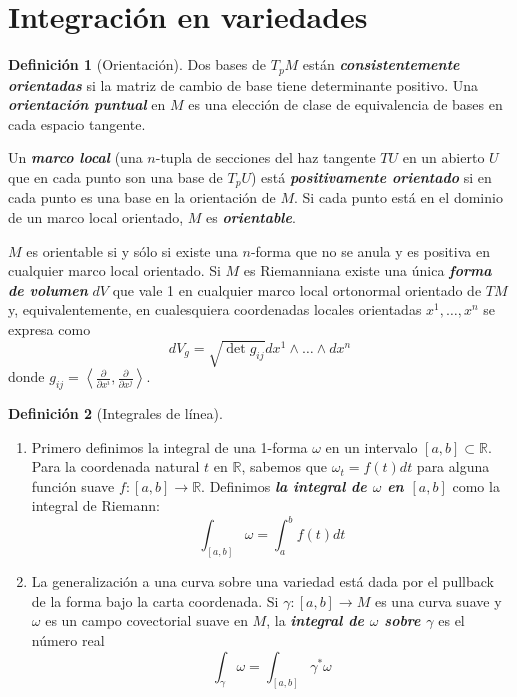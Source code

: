 \documentclass[spanish]{article}
\theoremstyle{definition}
\newtheorem*{defn}{Definición}
\newcommand{\R}{\mathbb{R}}
\begin{document}
	
	
	\section{Integración en variedades}\label{sec:3}
	\begin{defn}[Orientación]\leavevmode
		
		Dos bases de $T_pM$ están \textbf{\textit{consistentemente orientadas}} si la matriz de cambio de base tiene determinante positivo. Una \textbf{\textit{orientación puntual}} en $M$ es una elección de clase de equivalencia de bases en cada espacio tangente. 
		
		Un \textbf{\textit{marco local}} (una $n$-tupla de secciones del haz tangente $TU$ en un abierto $U$ que en cada punto son una base de $T_pU$) está \textbf{\textit{positivamente orientado}} si en cada punto es una base en la orientación de $M$. Si cada punto está en el dominio de un marco local orientado, $M$ es \textbf{\textit{orientable}}.
		
		$M$ es orientable si y sólo si existe una $n$-forma que no se anula y es positiva en cualquier marco local orientado. Si $M$ es Riemanniana existe una única \textbf{\textit{forma de volumen}} $dV$ que vale 1 en cualquier marco local ortonormal orientado de $TM$ y, equivalentemente, en cualesquiera coordenadas locales orientadas $x^1,\ldots,x^n$ se expresa como
		\[dV_g=\sqrt{\det g_{ij}}dx^1\wedge\ldots\wedge dx^n\]
		donde $g_{ij}=\left\langle\frac{\partial}{\partial x^i},\frac{\partial}{\partial x^j}\right\rangle$.
	\end{defn}
	
	\begin{defn}[Integrales de línea]\leavevmode
		\begin{enumerate}
			\item Primero definimos la integral de una 1-forma $\omega$ en un intervalo $[a,b]\subset\R$. Para la coordenada natural $t$ en $\R$, sabemos que $\omega_t=f(t)dt$ para alguna función suave $f:[a,b]\to\R$. Definimos \textbf{\textit{la integral de $\omega$ en $[a,b]$}} como la integral de Riemann:
			\[\int_{[a,b]}\omega=\int_a^bf(t)dt\]
			
			\item La generalización a una curva sobre una variedad está dada por el pullback de la forma bajo la carta coordenada. Si $\gamma:[a,b]\to M$ es una curva suave y $\omega$ es un campo covectorial suave en $M$, la \textbf{\textit{integral de $\omega$ sobre $\gamma$}} es el número real
			\[\int_\gamma\omega=\int_{[a,b]}\gamma^*\omega\]
		\end{enumerate}
	\end{defn}
	
\end{document}
